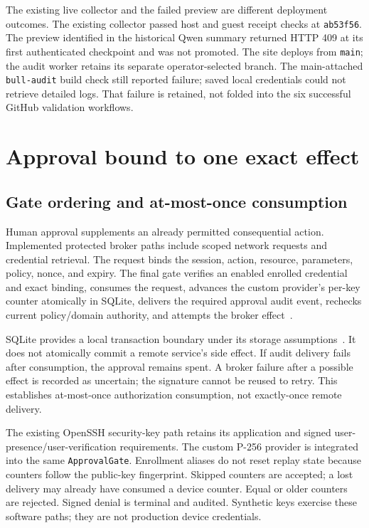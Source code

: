 \documentclass[journal]{IEEEtran}
\newcommand{\code}[1]{\texttt{#1}}
\begin{document}
The existing live collector and the failed preview are different deployment outcomes. The existing collector passed host and guest receipt checks at \code{ab53f56}. The preview identified in the historical Qwen summary returned HTTP 409 at its first authenticated checkpoint and was not promoted. The site deploys from \code{main}; the audit worker retains its separate operator-selected branch. The main-attached \code{bull-audit} build check still reported failure; saved local credentials could not retrieve detailed logs. That failure is retained, not folded into the six successful GitHub validation workflows.

\section{Approval bound to one exact effect}
\subsection{Gate ordering and at-most-once consumption}
Human approval supplements an already permitted consequential action. Implemented protected broker paths include scoped network requests and credential retrieval. The request binds the session, action, resource, parameters, policy, nonce, and expiry. The final gate verifies an enabled enrolled credential and exact binding, consumes the request, advances the custom provider's per-key counter atomically in SQLite, delivers the required approval audit event, rechecks current policy/domain authority, and attempts the broker effect~\cite{approval}.

SQLite provides a local transaction boundary under its storage assumptions~\cite{sqlite}. It does not atomically commit a remote service's side effect. If audit delivery fails after consumption, the approval remains spent. A broker failure after a possible effect is recorded as uncertain; the signature cannot be reused to retry. This establishes at-most-once authorization consumption, not exactly-once remote delivery.

The existing OpenSSH security-key path retains its application and signed user-presence/user-verification requirements. The custom P-256 provider is integrated into the same \code{ApprovalGate}. Enrollment aliases do not reset replay state because counters follow the public-key fingerprint. Skipped counters are accepted; a lost delivery may already have consumed a device counter. Equal or older counters are rejected. Signed denial is terminal and audited. Synthetic keys exercise these software paths; they are not production device credentials.
\end{document}
